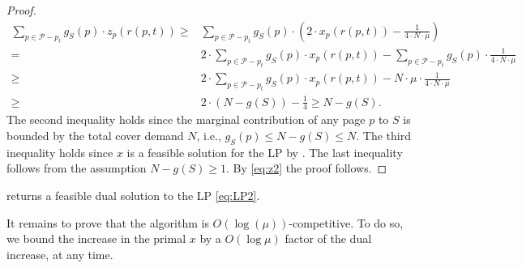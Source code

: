 \documentclass[11pt]{article}
\newcommand{\comment}[1]{}
\newcommand{\cP}{{\mathcal{P}}}
\begin{document}
{\begin{proof}
\begin{equation}
	\label{eq:z2}
	\begin{aligned}
		 \sum_{p \in \cP-p_t} g_S(p) \cdot z_p(r(p,t))
		\geq{} &   \sum_{p \in \cP-p_t} g_S(p) \cdot \left( 2 \cdot x_p(r(p,t))-\frac{1}{4 \cdot N \cdot \mu} \right)\\
		={} & 2 \cdot \sum_{p \in \cP-p_t} g_S(p) \cdot x_p(r(p,t))-\sum_{p \in \cP-p_t} g_S(p) \cdot \frac{1}{4 \cdot N \cdot \mu} \\
		\geq{} & 2 \cdot \sum_{p \in \cP-p_t} g_S(p) \cdot x_p(r(p,t))-N \cdot \mu \cdot \frac{1}{4 \cdot N \cdot \mu} \\
			\geq{} & 2 \cdot \left(N-g(S)\right)-\frac{1}{4} 
				\geq N-g(S). 
	\end{aligned}
\end{equation}
The second inequality holds since the marginal contribution of any page $p$ to $S$ is bounded by the total cover demand $N$, i.e., $g_S(p) \leq N-g(S) \leq N$. The third inequality holds since $x$ is a feasible solution for the LP by .   The last inequality follows from the assumption $N-g(S) \geq 1$. By \eqref{eq:z2} the proof follows. 
\end{proof}
}


	\begin{lemma}
	\label{lem:FFeasible}
	 returns a feasible dual solution to the \textnormal{LP} \eqref{eq:LP2}. 
\end{lemma}

\comment{
\begin{proof}
To prove that the dual $y$ is also feasible, consider some $p \in \cP$ and $j \in [n_p]$. By the update rate of $x_p(j)$ in \Cref{step:fx} it follows that 
		\begin{equation}
		\label{eq:FromSAP}
		\frac{1}{\mu} \cdot \left(     \exp \left(  \frac{\ln (\mu+1)}{c(p)} \cdot Y_p(j)\right)-1\right) = x_p(j) \leq 1.
	\end{equation} 
	The inequality holds since $Y_p(j)$ does not increase in time $t$ if $p$ is already fully evicted at this time by \Cref{step:InWhile}; that is, once $x_p(r(p,t)) = 1$ it holds that $Q$ is no longer minimal and the algorithm chooses a new minimal set $Q'$ that includes $p$. Thus, by simplifying the expression in \eqref{eq:FromSAP} it holds that 
	$$\exp \left( \frac{\ln (\mu+1)}{c(p)} \cdot Y_p(j) \right) \leq \mu+1.$$
	by taking logarithms from both sides $Y_p(j) \leq c(p)$. Hence, $y$ is a feasible dual solution. 
\end{proof}
}
It remains to prove that the algorithm is $O(\log (\mu))$-competitive. To do so, we bound the increase in the primal $x$ by a $O(\log \mu)$ factor of the dual increase, at any time. 
\end{document}
